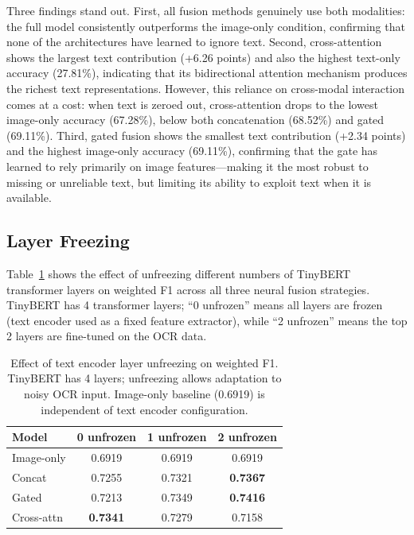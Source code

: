 \documentclass[10pt,twocolumn]{article}
\begin{document}
Three findings stand out. First, all fusion methods genuinely use both modalities: the full model consistently outperforms the image-only condition, confirming that none of the architectures have learned to ignore text. Second, cross-attention shows the largest text contribution (+6.26 points) and also the highest text-only accuracy (27.81\%), indicating that its bidirectional attention mechanism produces the richest text representations. However, this reliance on cross-modal interaction comes at a cost: when text is zeroed out, cross-attention drops to the lowest image-only accuracy (67.28\%), below both concatenation (68.52\%) and gated (69.11\%). Third, gated fusion shows the smallest text contribution (+2.34 points) and the highest image-only accuracy (69.11\%), confirming that the gate has learned to rely primarily on image features---making it the most robust to missing or unreliable text, but limiting its ability to exploit text when it is available.

\subsection{Layer Freezing}

Table~\ref{tab:freezing} shows the effect of unfreezing different numbers of TinyBERT transformer layers on weighted F1 across all three neural fusion strategies. TinyBERT has 4 transformer layers; ``0 unfrozen'' means all layers are frozen (text encoder used as a fixed feature extractor), while ``2 unfrozen'' means the top 2 layers are fine-tuned on the OCR data.

\begin{table}[t]
\centering
\caption{Effect of text encoder layer unfreezing on weighted F1. TinyBERT has 4 layers; unfreezing allows adaptation to noisy OCR input. Image-only baseline (0.6919) is independent of text encoder configuration.}
\label{tab:freezing}
\small
\begin{tabular}{@{}lccc@{}}
\toprule
\textbf{Model} & \textbf{0 unfrozen} & \textbf{1 unfrozen} & \textbf{2 unfrozen} \\
\midrule
Image-only      & 0.6919 & 0.6919 & 0.6919 \\
Concat          & 0.7255 & 0.7321 & \textbf{0.7367} \\
Gated           & 0.7213 & 0.7349 & \textbf{0.7416} \\
Cross-attn      & \textbf{0.7341} & 0.7279 & 0.7158 \\
\bottomrule
\end{tabular}
\end{table}
\end{document}
